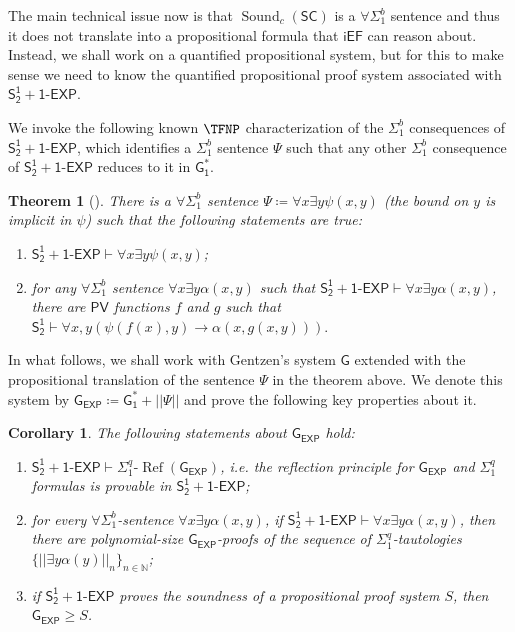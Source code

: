 \documentclass[11pt]{article}
\newcommand{\SOT}{\mathsf{S^1_2}}
\renewcommand{\PV}{\mathsf{PV}}
\newcommand{\SOTEXP}{\mathsf{S^1_2} + \mathsf{1\textsf{-}EXP}}
\newcommand{\Gent}{\mathsf{G}}
\newcommand{\GOS}{\mathsf{G^*_1}}
\newcommand{\iEF}{\mathsf{iEF}}
\renewcommand{\SC}{\mathsf{SC}}
\newcommand{\sound}{\operatorname{Sound}}
\def\GE{\mathsf{G_{EXP}}}
\def\sigmaref{\Sigma^q_1\text{-}\operatorname{Ref}}
\theoremstyle{definition}
\theoremstyle{plain}
\newtheorem{theorem}[definition]{Theorem}
\newtheorem{corollary}[definition]{Corollary}
\theoremstyle{remark}
\newcommand{\bN}{\mathbb{N}}
\begin{document}
The main technical issue now is that $\sound_c(\SC)$ is a $\forall\Sigma^b_1$ sentence and thus it does not translate into a propositional formula that $\iEF$ can reason about. Instead, we shall work on a quantified propositional system, but for this to make sense we need to know the quantified propositional proof system associated with $\SOTEXP$.

We invoke the following known $\TFNP$ characterization of the $\Sigma^b_1$ consequences of $\SOTEXP$, which identifies a  $\Sigma^b_1$ sentence $\Psi$ such that any other $\Sigma^b_1$ consequence of $\SOTEXP$ reduces to it in $\GOS$.

\begin{theorem}[\cite{Kra90, KNT11, Kra16, BS17}]\label{tfnpV}
There is a $\forall\Sigma^b_1$ sentence $\Psi\coloneqq\forall x\exists y\psi(x,y)$ (the bound on $y$ is implicit in $\psi$) such that the following statements are true:
    \begin{enumerate}[label=(\roman*)]
        \item $\SOTEXP\vdash \forall x \exists y\psi(x,y)$;
        \item for any $\forall\Sigma^b_1$ sentence $\forall x\exists y \alpha(x,y)$ such that $\SOTEXP\vdash\forall x\exists y \alpha(x,y)$, there are $\PV$ functions $f$ and $g$ such that $\SOT\vdash \forall x,y(\psi(f(x),y)\to\alpha(x,g(x,y))).$
    \end{enumerate}
\end{theorem}

In what follows, we shall work with Gentzen's system $\Gent$ extended with the propositional translation of the sentence $\Psi$ in the theorem above. We denote this system by $\GE\coloneqq\GOS+||\Psi||$ and prove the following key properties about it.

\begin{corollary}\label{wpV}
The following statements about $\GE$ hold:
\begin{enumerate}[label=(\roman*)]
    \item $\SOTEXP\vdash \sigmaref(\GE)$, i.e. the reflection principle for $\GE$ and $\Sigma^q_1$ formulas is provable in $\SOTEXP$;
    \item for every $\forall\Sigma^b_1$-sentence $\forall x\exists y\alpha(x,y)$, if $\SOTEXP\vdash\forall x\exists y\alpha(x,y)$, then there are polynomial-size $\GE$-proofs of the sequence of $\Sigma^q_1$-tautologies $\{||\exists y\alpha(y)||_n\}_{n\in\bN}$;
    \item if $\SOTEXP$ proves the soundness of a propositional proof system $S$, then $\GE\geq S$.
\end{enumerate}
\end{corollary}
\end{document}
